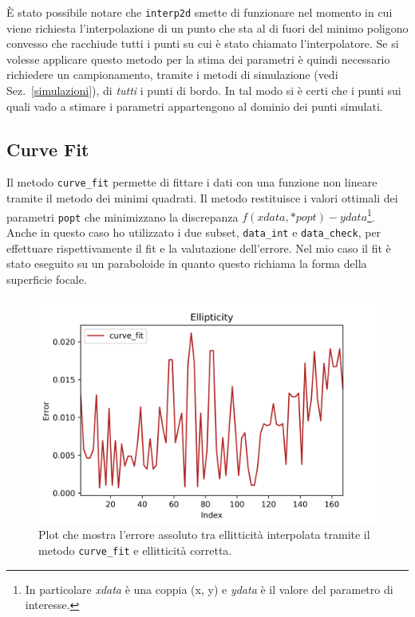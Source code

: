 \documentclass[12pt,a4paper,final]{book}
\begin{document}
\`E stato possibile notare che \texttt{interp2d} smette di funzionare nel momento in cui viene richiesta l'interpolazione di un punto che sta al di fuori del minimo poligono convesso che racchiude tutti i punti su cui è stato chiamato l'interpolatore. Se si volesse applicare questo metodo per la stima dei parametri è quindi necessario richiedere un campionamento, tramite i metodi di simulazione (vedi Sez.~\ref{simulazioni}), di \textit{tutti} i punti di bordo. In tal modo si è certi che i punti sui quali vado a stimare i parametri appartengono al dominio dei punti simulati.


\subsection{Curve Fit}\label{curve_fit}
Il metodo \texttt{curve\_fit} permette di fittare i dati con una funzione non lineare tramite il metodo dei minimi quadrati. Il metodo restituisce i valori ottimali dei parametri \texttt{popt} che minimizzano la discrepanza $f(xdata, *popt) - ydata$\footnote{In particolare \textit{xdata} è una coppia (x, y) e \textit{ydata} è il valore del parametro di interesse.}. Anche in questo caso ho utilizzato i due subset, \texttt{data\_int} e \texttt{data\_check}, per effettuare rispettivamente il fit e la valutazione dell'errore. Nel mio caso il fit è stato eseguito su un paraboloide in quanto questo richiama la forma della superficie focale.
\begin{figure}[!ht]
	\centering
	\includegraphics[scale=0.8]{../figures/error_curve_fit.png}
	\caption{Plot che mostra l'errore assoluto tra ellitticità interpolata tramite il metodo \texttt{curve\_fit} e ellitticità corretta.}
	\label{err_curve_fit}
\end{figure}
\end{document}
